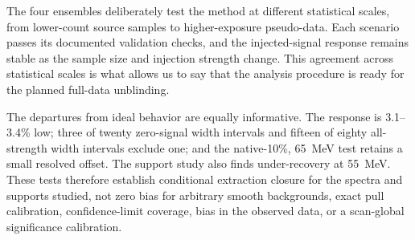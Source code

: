 The four ensembles deliberately test the method at different statistical scales,
from lower-count source samples to higher-exposure pseudo-data. Each scenario passes
its documented validation checks, and the injected-signal response remains stable
as the sample size and injection strength change. This agreement across statistical
scales is what allows us to say that the analysis procedure is ready for the planned
full-data unblinding.

The departures from ideal behavior are equally informative. The response is 3.1--3.4\%
low; three of twenty zero-signal width intervals and fifteen of eighty all-strength
width intervals exclude one; and the native-10\%, 65~MeV test retains a small resolved
offset. The support study also finds under-recovery at 55~MeV. These tests therefore
establish conditional extraction closure for the spectra and supports studied, not
zero bias for arbitrary smooth backgrounds, exact pull calibration, confidence-limit
coverage, bias in the observed data, or a scan-global significance calibration.
